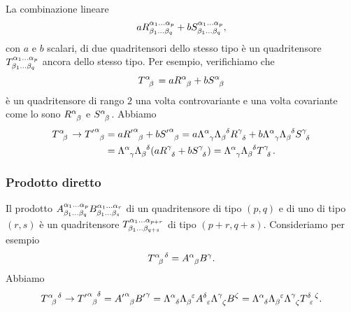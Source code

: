 La combinazione lineare
\begin{equation}
  a \tensor*{R}{^{\alpha_{1}\dots\alpha_{p}}_{\beta_{1}\dots\beta_{q}}} + b
  \tensor*{S}{^{\alpha_{1}\dots\alpha_{p}}_{\beta_{1}\dots\beta_{q}}},
\end{equation}
con $a$ e $b$ scalari, di due quadritensori dello stesso tipo è un quadritensore
$\tensor*{T}{^{\alpha_{1}\dots\alpha_{p}}_{\beta_{1}\dots\beta_{q}}}$ ancora
dello stesso tipo.  Per esempio, verifichiamo che
\begin{equation}
  \tensor{T}{^{\alpha}_{\beta}} = a \tensor{R}{^{\alpha}_{\beta}} + b
  \tensor{S}{^{\alpha}_{\beta}}
\end{equation}
è un quadritensore di rango $2$ una volta controvariante e una volta covariante
come lo sono $\tensor{R}{^{\alpha}_{\beta}}$ e
$\tensor{S}{^{\alpha}_{\beta}}$. Abbiamo
\begin{equation}
  \begin{split}
    \tensor{T}{^{\alpha}_{\beta}} \to \tensor{{T'}}{^{\alpha}_{\beta}} &= a
    \tensor{{R'}}{^{\alpha}_{\beta}} + b \tensor{{S'}}{^{\alpha}_{\beta}} = a
    \tensor{\Lambda}{^{\alpha}_{\gamma}} \tensor{\Lambda}{_{\beta}^{\delta}}
    \tensor{R}{^{\gamma}_{\delta}} + b \tensor{\Lambda}{^{\alpha}_{\gamma}}
    \tensor{\Lambda}{_{\beta}^{\delta}} \tensor{S}{^{\gamma}_{\delta}} \\
    &= \tensor{\Lambda}{^{\alpha}_{\gamma}}
    \tensor{\Lambda}{_{\beta}^{\delta}}(a \tensor{R}{^{\gamma}_{\delta}} + b
    \tensor{S}{^{\gamma}_{\delta}}) = \tensor{\Lambda}{^{\alpha}_{\gamma}}
    \tensor{\Lambda}{_{\beta}^{\delta}} \tensor{T}{^{\gamma}_{\delta}}.
  \end{split}
\end{equation}

\subsubsection{Prodotto diretto}
\label{sec:prodotto-diretto-minkowski}

Il prodotto
$\tensor*{A}{^{\alpha_{1}\dots\alpha_{p}}_{\beta_{1}\dots\beta_{q}}}
\tensor*{B}{^{\alpha_{1}\dots\alpha_{r}}_{\beta_{1}\dots\beta_{s}}}$
di un quadritensore di tipo $(p,q)$ e di uno di tipo $(r,s)$ è un quadritensore
$\tensor*{T}{^{\alpha_{1}\dots\alpha_{p+r}}_{\beta_{1}\dots\beta_{q+s}}}$ di
tipo $(p+r,q+s)$.  Consideriamo per esempio
\begin{equation}
  \tensor{T}{^{\alpha}_{\beta}^{\delta}} = \tensor{A}{^{\alpha}_{\beta}}
  \tensor{B}{^{\gamma}}.
\end{equation}
Abbiamo
\begin{equation}
  \tensor{T}{^{\alpha}_{\beta}^{\delta}} \to
  \tensor{{T'}}{^{\alpha}_{\beta}^{\delta}} = \tensor{{A'}}{^{\alpha}_{\beta}}
  \tensor{{B'}}{^{\gamma}} = \tensor{\Lambda}{^{\alpha}_{\delta}}
  \tensor{\Lambda}{_{\beta}^{\epsilon}} \tensor{A}{^{\delta}_{\epsilon}}
  \tensor{\Lambda}{^{\gamma}_{\zeta}} \tensor{B}{^{\zeta}} =
  \tensor{\Lambda}{^{\alpha}_{\delta}} \tensor{\Lambda}{_{\beta}^{\epsilon}}
  \tensor{\Lambda}{^{\gamma}_{\zeta}} \tensor{T}{^{\delta}_{\epsilon}^{\zeta}}.
\end{equation}

